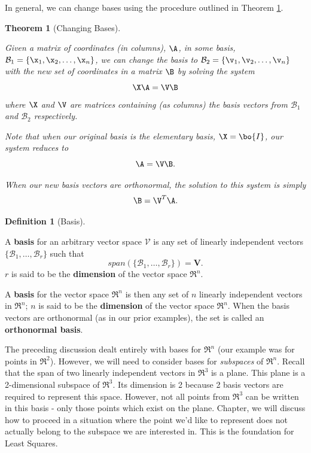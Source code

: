 \documentclass[
]{article}
\newtheorem{theorem}{Theorem}[section]
\theoremstyle{definition}
\newtheorem{definition}{Definition}[section]
\theoremstyle{definition}
\theoremstyle{definition}
\theoremstyle{definition}
\theoremstyle{remark}
\begin{document}
In general, we can change bases using the procedure outlined in Theorem \ref{thm:changebasedef}.

\begin{theorem}[Changing Bases]
\protect\hypertarget{thm:changebasedef}{}\label{thm:changebasedef}

Given a matrix of coordinates (in columns), \(\A\), in some basis, \(\mathcal{B}_1=\{\x_1,\x_2,\dots,\x_n\}\), we can change the basis to \(\mathcal{B}_2=\{\v_1,\v_2,\dots,\v_n\}\) with the new set of coordinates in a matrix \(\B\) by solving the system
\[\X\A=\V\B\]
where \(\X\) and \(\V\) are matrices containing (as columns) the basis vectors from \(\mathcal{B}_1\) and \(\mathcal{B}_2\) respectively.

Note that when our original basis is the elementary basis, \(\X=\bo{I}\), our system reduces to
\[\A=\V\B.\]

When our new basis vectors are orthonormal, the solution to this system is simply
\[\B=\V^T\A.\]

\end{theorem}

\begin{definition}[Basis]
\protect\hypertarget{def:basisdef}{}\label{def:basisdef}

A \textbf{basis} for an arbitrary vector space \(\mathcal{V}\) is any set of linearly independent vectors \(\{\mathcal{B}_1,\dots, \mathcal{B}_r\}\) such that \[span(\{\mathcal{B}_1,\dots, \mathcal{B}_r\}) = \mathcal{\mathbf{V}}.\]
\(r\) is said to be the \textbf{dimension} of the vector space \(\Re^n\).

A \textbf{basis} for the vector space \(\Re^n\) is then any set of \(n\) linearly independent vectors in \(\Re^n\); \(n\) is said to be the \textbf{dimension} of the vector space \(\Re^n\). When the basis vectors are orthonormal (as in our prior examples), the set is called an \textbf{orthonormal basis}.

\end{definition}

The preceding discussion dealt entirely with bases for \(\Re^n\) (our example was for points in \(\Re^2\)). However, we will need to consider bases for \emph{subspaces} of \(\Re^n\). Recall that the span of two linearly independent vectors in \(\Re^3\) is a plane. This plane is a 2-dimensional subspace of \(\Re^3\). Its dimension is 2 because 2 basis vectors are required to represent this space. However, not all points from \(\Re^3\) can be written in this basis - only those points which exist on the plane. Chapter, we will discuss how to proceed in a situation where the point we'd like to represent does not actually belong to the subspace we are interested in. This is the foundation for Least Squares.
\end{document}
